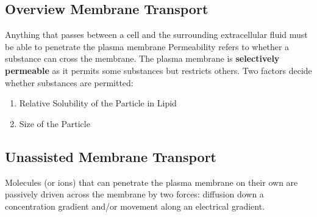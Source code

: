 \documentclass[11pt]{article}
\begin{document}
\subsection{Overview Membrane Transport}
Anything that passes between a cell and the surrounding extracellular fluid must be able to penetrate the plasma membrane
Permeability refers to whether a substance can cross the membrane. The plasma membrane is \textbf{selectively permeable} as it permits some substances but restricts others. Two factors decide whether substances are permitted:
\begin{enumerate}
\item Relative Solubility of the Particle in Lipid
\item Size of the Particle
\end{enumerate}






\subsection{Unassisted Membrane Transport}
Molecules (or ions) that can penetrate the plasma membrane on their own are passively driven across the membrane by two forces: diffusion down a concentration gradient and/or movement along an electrical gradient.
\end{document}
